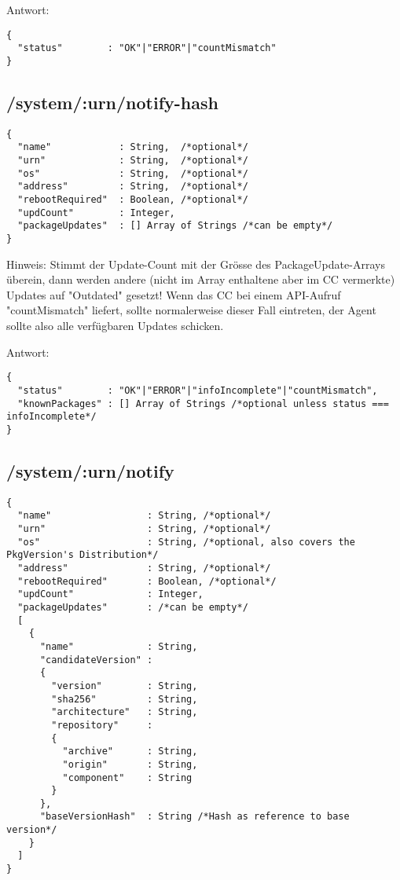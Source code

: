 Antwort:

\begin{verbatim}
{
  "status"        : "OK"|"ERROR"|"countMismatch" 
}
\end{verbatim}

\subsection*{/system/:urn/notify-hash}

\begin{verbatim}
{
  "name"            : String,  /*optional*/
  "urn"             : String,  /*optional*/
  "os"              : String,  /*optional*/
  "address"         : String,  /*optional*/
  "rebootRequired"  : Boolean, /*optional*/
  "updCount"        : Integer,
  "packageUpdates"  : [] Array of Strings /*can be empty*/
}
\end{verbatim}

Hinweis: Stimmt der Update-Count mit der Grösse des PackageUpdate-Arrays überein, dann werden andere (nicht im Array enthaltene aber im CC vermerkte) Updates auf "Outdated" gesetzt! Wenn das CC bei einem API-Aufruf "countMismatch" liefert, sollte normalerweise dieser Fall eintreten, der Agent sollte also alle verfügbaren Updates schicken.


Antwort:

\begin{verbatim}
{
  "status"        : "OK"|"ERROR"|"infoIncomplete"|"countMismatch",
  "knownPackages" : [] Array of Strings /*optional unless status === infoIncomplete*/
}
\end{verbatim}

\subsection*{/system/:urn/notify}

\begin{verbatim}
{
  "name"                 : String, /*optional*/
  "urn"                  : String, /*optional*/
  "os"                   : String, /*optional, also covers the PkgVersion's Distribution*/
  "address"              : String, /*optional*/
  "rebootRequired"       : Boolean, /*optional*/
  "updCount"             : Integer,
  "packageUpdates"       : /*can be empty*/
  [
    {
      "name"             : String,
      "candidateVersion" :
      {
        "version"        : String,
        "sha256"         : String,
        "architecture"   : String,
        "repository"     :
        {
          "archive"      : String,
          "origin"       : String,
          "component"    : String
        }
      },
      "baseVersionHash"  : String /*Hash as reference to base version*/
    }
  ]
}
\end{verbatim}

